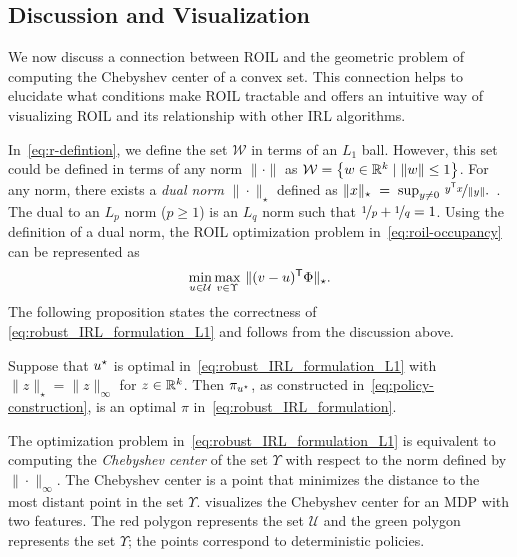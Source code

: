 \subsection{Discussion and Visualization}
\label{sec:geom-intu-reduct}

We now discuss a connection between ROIL and the geometric problem of computing the Chebyshev center of a convex set. This connection helps to elucidate what conditions make ROIL tractable and offers an intuitive way of visualizing ROIL and its relationship with other IRL algorithms. 

In~\eqref{eq:r-defintion}, we define the set $\mathcal{W}$ in terms of an $L_1$ ball. However, this set could be defined in terms of any norm $\| \cdot \|$ as $\mathcal{W} = \left\{ w\in \mathbb{R}^k \mid \| w \| \le 1 \right\}$.  For any norm, there exists a \emph{dual norm} $\| \cdot  \|_{\star}$ defined as \( \| x\|_{\star}\; =\;  \sup_{y \neq 0} \, \nicefrac{y ^{\mathsf{T}} x}{\|y\|} . \)~\cite{Horn2013}.
The dual to an $L_p$ norm ($p \ge 1$) is an $L_q$ norm such that $\nicefrac{1}{p} + \nicefrac{1}{q} = 1$. Using the definition of a dual norm, the ROIL optimization problem in~\eqref{eq:roil-occupancy} can be represented as
\begin{equation} \label{eq:robust_IRL_formulation_L1}
\min_{u \in \mathcal{U}} \max_{v \in \Upsilon} \, \|(v - u)^{\mathsf{T}} \Phi\|_{\star}.
\end{equation}
The following proposition states the correctness of \eqref{eq:robust_IRL_formulation_L1} and follows from the discussion above. 
\begin{proposition}
\label{thrm:chebeyshevRegret}
Suppose that $u^{\star}$ is optimal in~\eqref{eq:robust_IRL_formulation_L1} with $\| z  \|_{\star} = \| z \|_{\infty}$ for $z\in \mathbb{R}^k$. Then $\pi_{u^{\star}}$, as constructed in~\eqref{eq:policy-construction}, is an optimal $\pi$ in~\eqref{eq:robust_IRL_formulation}.
\end{proposition}

The optimization problem in~\eqref{eq:robust_IRL_formulation_L1} is equivalent to computing the \emph{Chebyshev center} of the set $\Upsilon$ with respect to the norm defined by $\| \cdot  \|_{\infty}$. The Chebyshev center is a point that minimizes the distance to the most distant point in the set $\Upsilon$.  visualizes the Chebyshev center for an MDP with two features. The red polygon represents the set $\mathcal{U}$ and the green polygon represents the set $\Upsilon$; the points correspond to deterministic policies.

